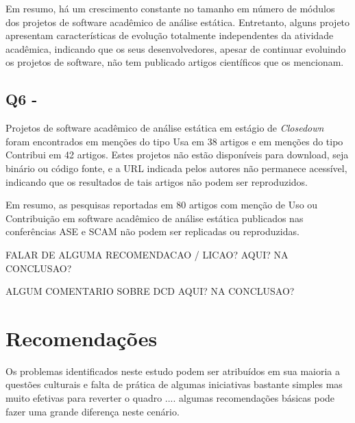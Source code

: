 Em resumo, há um crescimento constante no tamanho em número de módulos dos
projetos de software acadêmico de análise estática.
Entretanto, alguns projeto apresentam características de evolução 
totalmente independentes da atividade acadêmica, 
indicando que os seus desenvolvedores, 
apesar de continuar evoluindo os projetos de software,
não tem publicado artigos científicos que os mencionam.

\subsection{Q6 - \QuestaoSeis}


Projetos de software acadêmico de análise estática em estágio de {\it Closedown} 
foram encontrados em menções do tipo Usa em 38 artigos 
e em menções do tipo Contribui em 42 artigos.
Estes projetos não estão disponíveis para download, seja binário ou código fonte, 
e a URL indicada pelos autores não permanece acessível, 
indicando que os resultados de tais artigos não podem ser reproduzidos.

Em resumo, as pesquisas reportadas em 80 artigos com menção de Uso ou Contribuição em 
software acadêmico de análise estática publicados nas conferências ASE e SCAM 
não podem ser replicadas ou reproduzidas.


FALAR DE ALGUMA RECOMENDACAO / LICAO? AQUI? NA CONCLUSAO?

ALGUM COMENTARIO SOBRE DCD AQUI? NA CONCLUSAO?



\section{Recomendações}
\label{sec:recomendacoes}

Os problemas identificados neste estudo podem ser atribuídos em sua maioria a
questões culturais e falta de prática de algumas iniciativas bastante simples
mas muito efetivas para reverter o quadro .... algumas recomendações básicas
pode fazer uma grande diferença neste cenário.

